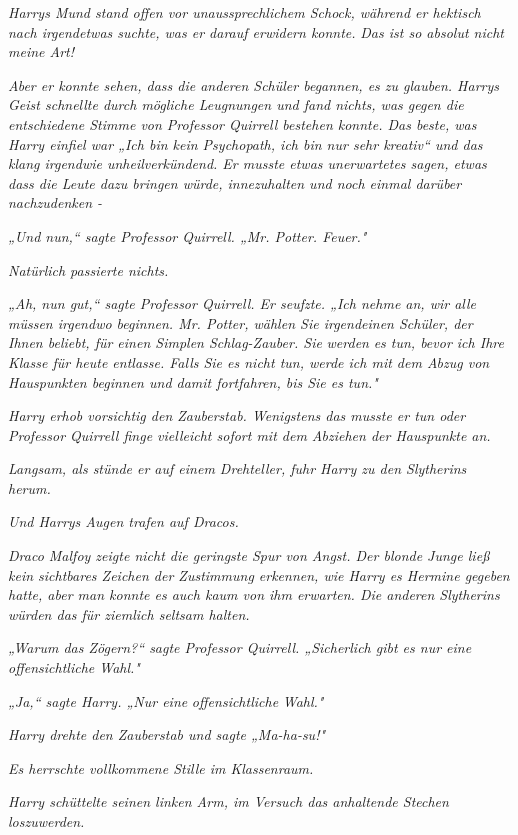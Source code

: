{\emph{Harrys Mund stand offen vor unaussprechlichem Schock, während er hektisch nach irgendetwas suchte, was er darauf erwidern konnte.} \emph{\emph{Das ist so absolut nicht meine Art!}}

\emph{Aber er konnte sehen, dass die anderen Schüler begannen, es zu glauben. Harrys Geist schnellte durch mögliche Leugnungen und fand nichts, was gegen die entschiedene Stimme von Professor Quirrell bestehen konnte. Das beste, was Harry einfiel war „Ich bin kein Psychopath, ich bin nur sehr kreativ“ und das klang irgendwie unheilverkündend. Er musste etwas unerwartetes sagen, etwas dass die Leute dazu bringen würde, innezuhalten und noch einmal darüber nachzudenken -}

\emph{„Und nun,“ sagte Professor Quirrell. „Mr. Potter. Feuer."}

\emph{Natürlich passierte nichts.}

\emph{„Ah, nun gut,“ sagte Professor Quirrell. Er seufzte. „Ich nehme an, wir alle müssen irgendwo beginnen. Mr. Potter, wählen Sie irgendeinen Schüler, der Ihnen beliebt, für einen Simplen Schlag-Zauber. Sie} \emph{\emph{werden}} \emph{es tun, bevor ich Ihre Klasse für heute entlasse. Falls Sie es nicht tun, werde ich mit dem Abzug von Hauspunkten beginnen und damit fortfahren, bis Sie es tun."}

\emph{Harry erhob vorsichtig den Zauberstab. Wenigstens das musste er tun oder Professor Quirrell finge vielleicht sofort mit dem Abziehen der Hauspunkte an.}

\emph{Langsam, als stünde er auf einem Drehteller, fuhr Harry zu den Slytherins herum.}

\emph{Und Harrys Augen trafen auf Dracos.}

\emph{Draco Malfoy zeigte nicht die geringste Spur von Angst. Der blonde Junge ließ kein sichtbares Zeichen der Zustimmung erkennen, wie Harry es Hermine gegeben hatte, aber man konnte es auch kaum von ihm erwarten. Die anderen Slytherins würden das für ziemlich seltsam halten.}

\emph{„Warum das Zögern?“ sagte Professor Quirrell. „Sicherlich gibt es nur eine offensichtliche Wahl."}

\emph{„Ja,“ sagte Harry. „Nur eine} \emph{\emph{offensichtliche}} \emph{Wahl."}

\emph{Harry drehte den Zauberstab und sagte „\emph{Ma-ha-su!}"}

\emph{Es herrschte vollkommene Stille im Klassenraum.}

\emph{Harry schüttelte seinen linken Arm, im Versuch das anhaltende Stechen loszuwerden.}

}
